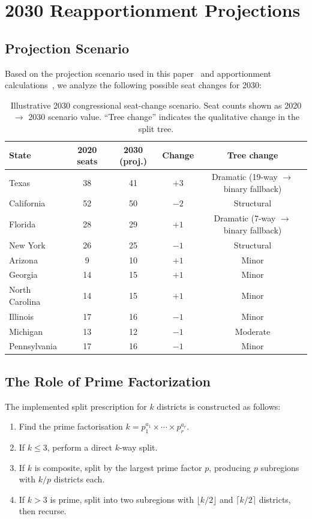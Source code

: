 \section{2030 Reapportionment Projections}
\label{sec:projections}

\subsection{Projection Scenario}

Based on the projection scenario used in this paper~\citep{census2030proj}
and \hh{} apportionment calculations~\citep{huntington1928,balinski1982},
we analyze the following possible seat changes for 2030:

\begin{table}[h]
\centering
\caption{Illustrative 2030 congressional seat-change scenario. Seat counts
         shown as 2020 $\to$ 2030 scenario value. ``Tree change'' indicates
         the qualitative change in the \ar{} split tree.}
\label{tab:projections}
\small
\begin{tabular}{lcccc}
\toprule
State & 2020 seats & 2030 (proj.) & Change & Tree change \\
\midrule
Texas & 38 & 41 & $+3$ & Dramatic (19-way $\to$ binary fallback) \\
California & 52 & 50 & $-2$ & Structural \\
Florida & 28 & 29 & $+1$ & Dramatic (7-way $\to$ binary fallback) \\
New York & 26 & 25 & $-1$ & Structural \\
Arizona & 9 & 10 & $+1$ & Minor \\
Georgia & 14 & 15 & $+1$ & Minor \\
North Carolina & 14 & 15 & $+1$ & Minor \\
Illinois & 17 & 16 & $-1$ & Minor \\
Michigan & 13 & 12 & $-1$ & Moderate \\
Pennsylvania & 17 & 16 & $-1$ & Minor \\
\bottomrule
\end{tabular}
\end{table}

\subsection{The Role of Prime Factorization}

The implemented \ar{} split prescription for $k$ districts is constructed as
follows:
\begin{enumerate}
\item Find the prime factorisation $k = p_1^{a_1} \times \cdots \times p_r^{a_r}$.
\item If $k \leq 3$, perform a direct $k$-way split.
\item If $k$ is composite, split by the largest prime factor $p$, producing
      $p$ subregions with $k/p$ districts each.
\item If $k > 3$ is prime, split into two subregions with
      $\lfloor k/2 \rfloor$ and $\lceil k/2 \rceil$ districts, then recurse.
\end{enumerate}

